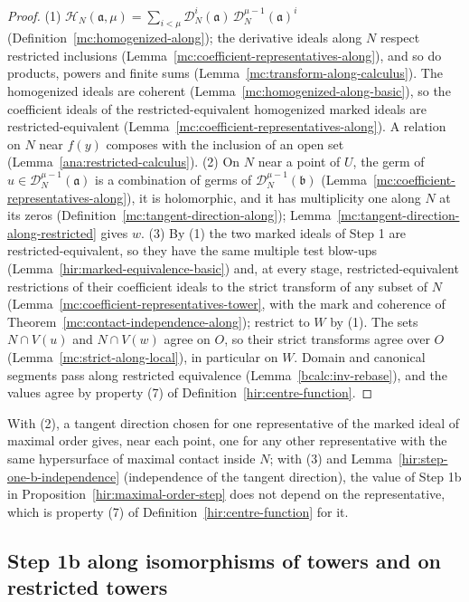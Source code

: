 \begin{proof}
\leanok
(1) \(\mathcal H_N(\mathfrak a,\mu)=\sum_{i<\mu}\mathcal D_N^i(\mathfrak a)\,\mathcal D_N^{\mu-1}(\mathfrak a)^i\) (Definition~\ref{mc:homogenized-along}); the derivative ideals along \(N\) respect
restricted inclusions (Lemma~\ref{mc:coefficient-representatives-along}), and so do products, powers and finite sums (Lemma~\ref{mc:transform-along-calculus}). The
homogenized ideals are coherent (Lemma~\ref{mc:homogenized-along-basic}), so the coefficient ideals of the restricted-equivalent homogenized marked ideals are
restricted-equivalent (Lemma~\ref{mc:coefficient-representatives-along}). A relation on \(N\) near \(f(y)\) composes with the inclusion of an open set
(Lemma~\ref{ana:restricted-calculus}).
(2) On \(N\) near a point of \(U\), the germ of \(u\in\mathcal D_N^{\mu-1}(\mathfrak a)\) is a combination of germs of \(\mathcal D_N^{\mu-1}(\mathfrak b)\) (Lemma~\ref{mc:coefficient-representatives-along}),
it is holomorphic, and it has multiplicity one along \(N\) at its zeros (Definition~\ref{mc:tangent-direction-along}); Lemma~\ref{mc:tangent-direction-along-restricted}
gives \(w\).
(3) By (1) the two marked ideals of Step 1 are restricted-equivalent, so they have the same multiple test blow-ups (Lemma~\ref{hir:marked-equivalence-basic}) and, at
every stage, restricted-equivalent restrictions of their coefficient ideals to the strict transform of any subset of \(N\) (Lemma~\ref{mc:coefficient-representatives-tower},
with the mark and coherence of Theorem~\ref{mc:contact-independence-along}); restrict to \(W\) by (1). The sets \(N\cap V(u)\) and \(N\cap V(w)\) agree on \(O\), so their
strict transforms agree over \(O\) (Lemma~\ref{mc:strict-along-local}), in particular on \(W\). Domain and canonical segments pass along restricted equivalence
(Lemma~\ref{bcalc:inv-rebase}), and the values agree by property (7) of Definition~\ref{hir:centre-function}.
\end{proof}
With (2), a tangent direction chosen for one representative of the marked ideal of maximal order gives, near each point, one for any other representative with
the same hypersurface of maximal contact inside \(N\); with (3) and Lemma~\ref{hir:step-one-b-independence} (independence of the tangent direction), the value of
Step 1b in Proposition~\ref{hir:maximal-order-step} does not depend on the representative, which is property (7) of Definition~\ref{hir:centre-function} for it.

\subsection{Step 1b along isomorphisms of towers and on restricted towers}

